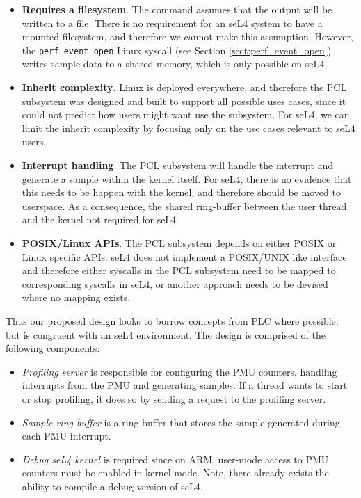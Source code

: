 \ssp\begin{itemize}
    \item \textbf{Requires a filesystem}. The  command assumes that the output will be written to a file. There is no requirement for an seL4 system to have a mounted filesystem, and therefore we cannot make this assumption. However, the \texttt{perf\_event\_open} Linux syscall (see Section \ref{sect:perf_event_open}) writes sample data to a shared memory, which is only possible on seL4.
    \item \textbf{Inherit complexity}. Linux is deployed everywhere, and therefore the PCL subsystem was designed and built to support all possible uses cases, since it could not predict how users might want use the subsystem. For seL4, we can limit the inherit complexity by focusing only on the use cases relevant to seL4 users.
    \item \textbf{Interrupt handling}. The PCL subsystem will handle the interrupt and generate a sample within the kernel itself. For seL4, there is no evidence that this needs to be happen with the kernel, and therefore should be moved to userspace. As a consequence, the shared ring-buffer between the user thread and the kernel not required for seL4.
    \item \textbf{POSIX/Linux APIs}. The PCL subsystem depends on either POSIX or Linux specific APIs. seL4 does not implement a POSIX/UNIX like interface and therefore either syscalls in the PCL subsystem need to be mapped to corresponding syscalls in seL4, or another approach needs to be devised where no mapping exists.
\end{itemize}\dsp

Thus our proposed design looks to borrow concepts from PLC where possible, but is congruent with an seL4 environment. The design is comprised of the following components:

\ssp\begin{itemize}
    \item \textit{Profiling server} is responsible for configuring the PMU counters, handling interrupts from the PMU and generating samples. If a thread wants to start or stop profiling, it does so by sending a request to the profiling server.
    \item \textit{Sample ring-buffer} is a ring-buffer that stores the sample generated during each PMU interrupt.
    \item \textit{Debug seL4 kernel} is required since on ARM, user-mode access to PMU counters must be enabled in kernel-mode. Note, there already exists the ability to compile a debug version of seL4.
\end{itemize}\dsp

